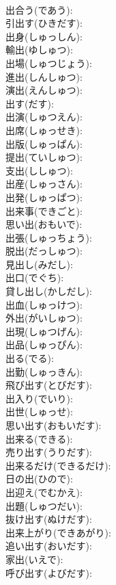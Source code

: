 \documentclass[8pt]{extreport}
\begin{document}
\begin{CJK}{UTF8}{min}
\\	出合う(であう): 
\\	引出す(ひきだす): 
\\	出身(しゅっしん): 
\\	輸出(ゆしゅつ): 
\\	出場(しゅつじょう): 
\\	進出(しんしゅつ): 
\\	演出(えんしゅつ): 
\\	出す(だす): 
\\	出演(しゅつえん): 
\\	出席(しゅっせき): 
\\	出版(しゅっぱん): 
\\	提出(ていしゅつ): 
\\	支出(ししゅつ): 
\\	出産(しゅっさん): 
\\	出発(しゅっぱつ): 
\\	出来事(できごと): 
\\	思い出(おもいで): 
\\	出張(しゅっちょう): 
\\	脱出(だっしゅつ): 
\\	見出し(みだし): 
\\	出口(でぐち): 
\\	貸し出し(かしだし): 
\\	出血(しゅっけつ): 
\\	外出(がいしゅつ): 
\\	出現(しゅつげん): 
\\	出品(しゅっぴん): 
\\	出る(でる): 
\\	出勤(しゅっきん): 
\\	飛び出す(とびだす): 
\\	出入り(でいり): 
\\	出世(しゅっせ): 
\\	思い出す(おもいだす): 
\\	出来る(できる): 
\\	売り出す(うりだす): 
\\	出来るだけ(できるだけ): 
\\	日の出(ひので): 
\\	出迎え(でむかえ): 
\\	出題(しゅつだい): 
\\	抜け出す(ぬけだす): 
\\	出来上がり(できあがり): 
\\	追い出す(おいだす): 
\\	家出(いえで): 
\\	呼び出す(よびだす): 

\end{CJK}
\end{document}

